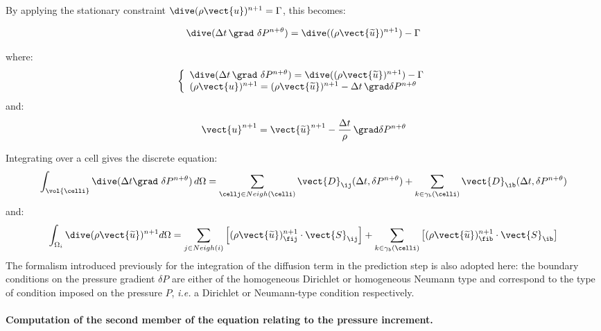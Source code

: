 By applying the stationary constraint $\dive(\rho\vect{u})^{n+1}=\Gamma$,
this becomes:

\begin{equation}
\dive(\Delta t\, \grad\ \delta P^{n+\theta})=\dive((\rho \vect{\widetilde{u}})^{n+1})-\Gamma
\end{equation}

where:
\begin{equation}
\left\{\begin{array}{l}
\dive(\Delta t\, \grad\ \delta P^{n+\theta})=\dive((\rho \vect{\widetilde{u}})^{n+1})-\Gamma\\
(\rho\vect{u})^{n+1} = (\rho\vect{\widetilde{u}})^{n+1}-\Delta t\, \grad \delta P^{n+\theta}
\end{array}\right.
\end{equation}
and:
\begin{equation}
\label{eq:navstv:discrete_correction_velocity}
\vect{u}^{n+1} = \vect{\widetilde{u}}^{n+1}-\frac{\Delta t}{\rho}\, \grad\delta
P^{n+\theta}
\end{equation}

Integrating over a cell gives the discrete equation:
\begin{equation}
\int_{\vol{\celli}}{\dive(\Delta t \grad\ \delta P^{n+\theta})\, d\Omega} =
\sum\limits_{\cellj \in Neigh(\celli)}{\vect{D}_{\ij}(\Delta t, \delta P^{n+\theta})}
+\sum_{k\in {\gamma_b(\celli)}} {\vect{D}_{\ib}(\Delta t, \delta P^{n+\theta})}
\label{eq:navstv:discrete_correction_step}
\end{equation}
and:
\begin{equation}
\int_{\Omega_i}{\dive(\rho \vect{\widetilde{u}})^{n+1}  d\Omega} =
\sum_{j\in Neigh{(i)}}{\left[ (\rho
\vect{\widetilde{u}})^{n+1}_{\fij} \cdot \vect{S}_{\ij}\right]}
+\sum_{k\in {\gamma_b(\celli)}} \left[{(\rho \vect{\widetilde{u}})^{n+1}_{\fib}} \cdot \vect{S}_{\ib}\right]
\end{equation}
The formalism introduced previously for the integration of the diffusion term in
the prediction step is also adopted here: the boundary conditions on the
pressure gradient $\delta P$ are either of the homogeneous Dirichlet or
homogeneous Neumann type and correspond to the type of condition imposed
on the pressure $P$, \emph{i.e.} a Dirichlet or Neumann-type condition
respectively.

\paragraph{Computation of the second member of the equation relating to the
pressure increment.\\ }

